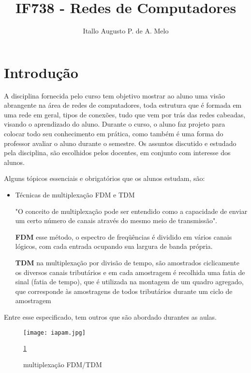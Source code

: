 \documentclass[10pt]{article}
\title{IF738 - Redes de Computadores}
\author{Itallo Augusto P. de A. Melo }
\date{\vspace{-5ex}}
\begin{document}
\maketitle

\section{Introdução}
\label{intro}
\label{um}

 A disciplina fornecida pelo curso tem objetivo mostrar ao aluno uma visão abrangente na área de redes de computadores, toda estrutura que é formada em uma rede em geral, tipos de conexões, tudo que vem por trás das redes cabeadas, visando o aprendizado do aluno. Durante o curso, o aluno faz projeto para colocar todo seu conhecimento em prática, como também é uma forma do professor avaliar o aluno durante o semestre. Os assuntos discutido e estudado pela disciplina, são escolhidos pelos docentes, em conjunto com interesse dos alunos.\cite{intro}

Alguns tópicos essenciais e obrigatórios que os alunos estudam, são:\cite{um}

\begin{itemize}
    \item Técnicas de multiplexação FDM e TDM
    
   "O conceito de multiplexação pode ser entendido como a capacidade de enviar um certo número de canais através do mesmo meio de transmissão".
    
    \textbf{FDM} esse método, o espectro de freqüências é dividido em vários canais lógicos, com cada entrada ocupando sua largura de banda própria.
    
    \textbf{TDM} na multiplexação por divisão de tempo, são amostrados ciclicamente os diversos canais tributários e em cada amostragem é recolhida uma fatia de sinal (fatia de tempo), que é utilizada na montagem de um quadro agregado, que corresponde às amostragens de todos tributários durante um ciclo de amostragem 
    
\end{itemize}
 
Entre esse especificado, tem outros que são abordado durantes as aulas.

\begin{figure}[h!]
    \centering
    \texttt{[image: iapam.jpg]}
    \caption{multiplexação FDM/TDM}
    \label{fig:imagem}
     \ref{fig:imagem} 
\end{figure}
\end{document}
